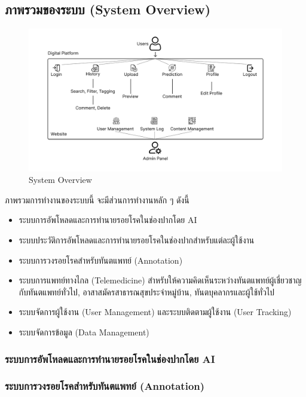 \subsection{ภาพรวมของระบบ (System Overview)}
\begin{figure}[h]
    \begin{center}
        \includegraphics[width=1\textwidth]{img/Overview System Design.png}
    \end{center}
    \caption[Poem]{System Overview}
    \label{fig:walrus}
\end{figure}

ภาพรวมการทำงานของระบบนี้ จะมีส่วนการทำงานหลัก ๆ ดังนี้
\begin{itemize}
    \item ระบบการอัพโหลดและการทำนายรอยโรคในช่องปากโดย AI
    \item ระบบประวัติการอัพโหลดและการทำนายรอยโรคในช่องปากสำหรับแต่ละผู้ใช้งาน
    \item ระบบการวงรอยโรคสำหรับทันตแพทย์ (Annotation)
    \item ระบบการแพทย์ทางไกล (Telemedicine) สำหรับให้ความคิดเห็นระหว่างทันตแพทย์ผู้เชี่ยวชาญกับทันตแพทย์ทั่วไป, อาสาสมัครสาธารณสุขประจำหมู่บ้าน, ทันตบุคลากรและผู้ใช้ทั่วไป
    \item ระบบจัดการผู้ใช้งาน (User Management) และระบบติดตามผู้ใช้งาน (User Tracking)
    \item ระบบจัดการข้อมูล (Data Management)
\end{itemize}

\subsubsection{ระบบการอัพโหลดและการทำนายรอยโรคในช่องปากโดย AI}


\subsubsection{ระบบการวงรอยโรคสำหรับทันตแพทย์ (Annotation)}

